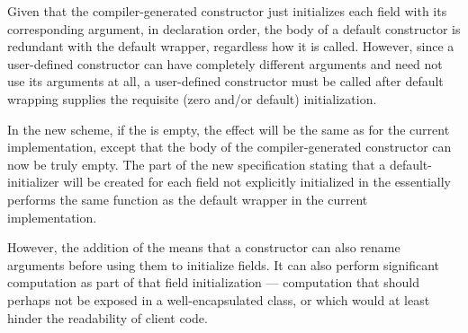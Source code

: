 Given that the compiler-generated
constructor just initializes each field with its corresponding argument, in
declaration order, the body of a default constructor is redundant with the
default wrapper, regardless how it is called.  However, since a user-defined
constructor can have completely different arguments and need not use its
arguments at all, a user-defined constructor must be called after default
wrapping supplies the requisite (zero and/or default) initialization.

In the new scheme, if the  is empty, the effect will
be the same as for the current implementation, except that the body of the
compiler-generated constructor can now be truly empty.  The part of the
new specification stating that a default-initializer will be created for each
field not explicitly initialized in the  essentially
performs the same function as the default wrapper in the current implementation.

However, the addition of the  means that a
constructor can also rename arguments before using them to initialize fields.
It can also perform significant computation as part of that field initialization
--- computation that should perhaps not be exposed in a well-encapsulated class,
or which would at least hinder the readability of client code.

